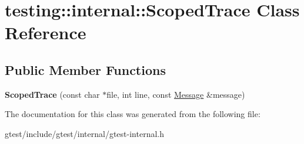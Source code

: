 \hypertarget{classtesting_1_1internal_1_1ScopedTrace}{}\section{testing\+:\+:internal\+:\+:Scoped\+Trace Class Reference}
\label{classtesting_1_1internal_1_1ScopedTrace}
\subsection*{Public Member Functions}
\begin{DoxyCompactItemize}
\item 
\mbox{\label{classtesting_1_1internal_1_1ScopedTrace_ab965d7010bbbc82c1bef6ebf8748bede}} 
{\bfseries Scoped\+Trace} (const char $\ast$file, int line, const \hyperlink{classtesting_1_1Message}{Message} \&message)
\end{DoxyCompactItemize}


The documentation for this class was generated from the following file\+:\begin{DoxyCompactItemize}
\item 
gtest/include/gtest/internal/gtest-\/internal.\+h\end{DoxyCompactItemize}
